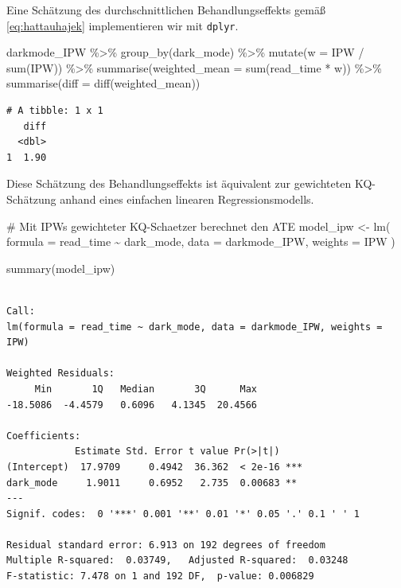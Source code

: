 \documentclass[
  a4paper,
  DIV=11,
  oneside]{scrreprt}
\newenvironment{Shaded}{\begin{snugshade}}{\end{snugshade}}
\newcommand{\AttributeTok}[1]{\textcolor[rgb]{0.40,0.45,0.13}{#1}}
\newcommand{\CommentTok}[1]{\textcolor[rgb]{0.37,0.37,0.37}{#1}}
\newcommand{\FunctionTok}[1]{\textcolor[rgb]{0.28,0.35,0.67}{#1}}
\newcommand{\NormalTok}[1]{\textcolor[rgb]{0.00,0.23,0.31}{#1}}
\newcommand{\OtherTok}[1]{\textcolor[rgb]{0.00,0.23,0.31}{#1}}
\newcommand{\SpecialCharTok}[1]{\textcolor[rgb]{0.37,0.37,0.37}{#1}}
\begin{document}
Eine Schätzung des durchschnittlichen Behandlungseffekts gemäß
\eqref{eq:hattauhajek} implementieren wir mit \texttt{dplyr}.

\begin{Shaded}
\begin{Highlighting}[]
\NormalTok{darkmode\_IPW }\SpecialCharTok{\%\textgreater{}\%}
  \FunctionTok{group\_by}\NormalTok{(dark\_mode) }\SpecialCharTok{\%\textgreater{}\%}
  \FunctionTok{mutate}\NormalTok{(}\AttributeTok{w =}\NormalTok{ IPW }\SpecialCharTok{/} \FunctionTok{sum}\NormalTok{(IPW)) }\SpecialCharTok{\%\textgreater{}\%}
  \FunctionTok{summarise}\NormalTok{(}\AttributeTok{weighted\_mean =} \FunctionTok{sum}\NormalTok{(read\_time }\SpecialCharTok{*}\NormalTok{ w)) }\SpecialCharTok{\%\textgreater{}\%}
  \FunctionTok{summarise}\NormalTok{(}\AttributeTok{diff =} \FunctionTok{diff}\NormalTok{(weighted\_mean))}
\end{Highlighting}
\end{Shaded}

\begin{verbatim}
# A tibble: 1 x 1
   diff
  <dbl>
1  1.90
\end{verbatim}

Diese Schätzung des Behandlungseffekts ist äquivalent zur gewichteten
KQ-Schätzung anhand eines einfachen linearen Regressionsmodells.

\begin{Shaded}
\begin{Highlighting}[]
\CommentTok{\# Mit IPWs gewichteter KQ{-}Schaetzer berechnet den ATE}
\NormalTok{model\_ipw }\OtherTok{\textless{}{-}} \FunctionTok{lm}\NormalTok{(}
  \AttributeTok{formula =}\NormalTok{ read\_time }\SpecialCharTok{\textasciitilde{}}\NormalTok{ dark\_mode, }
  \AttributeTok{data =}\NormalTok{ darkmode\_IPW,}
  \AttributeTok{weights =}\NormalTok{ IPW}
\NormalTok{)}

\FunctionTok{summary}\NormalTok{(model\_ipw)}
\end{Highlighting}
\end{Shaded}

\begin{verbatim}

Call:
lm(formula = read_time ~ dark_mode, data = darkmode_IPW, weights = IPW)

Weighted Residuals:
     Min       1Q   Median       3Q      Max 
-18.5086  -4.4579   0.6096   4.1345  20.4566 

Coefficients:
            Estimate Std. Error t value Pr(>|t|)    
(Intercept)  17.9709     0.4942  36.362  < 2e-16 ***
dark_mode     1.9011     0.6952   2.735  0.00683 ** 
---
Signif. codes:  0 '***' 0.001 '**' 0.01 '*' 0.05 '.' 0.1 ' ' 1

Residual standard error: 6.913 on 192 degrees of freedom
Multiple R-squared:  0.03749,   Adjusted R-squared:  0.03248 
F-statistic: 7.478 on 1 and 192 DF,  p-value: 0.006829
\end{verbatim}
\end{document}
